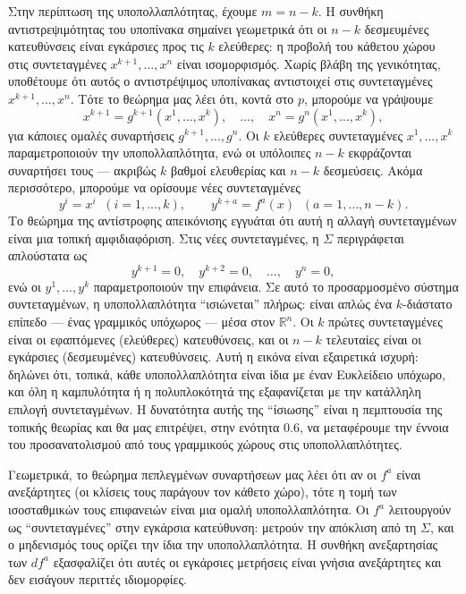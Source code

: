 \documentclass[12pt]{article}
\begin{document}
Στην περίπτωση της υποπολλαπλότητας, έχουμε $m = n-k$. Η συνθήκη αντιστρεψιμότητας του υποπίνακα σημαίνει γεωμετρικά ότι οι $n-k$ δεσμευμένες κατευθύνσεις είναι εγκάρσιες προς τις $k$ ελεύθερες: η προβολή του κάθετου χώρου στις συντεταγμένες $x^{k+1}, \dots, x^n$ είναι ισομορφισμός. Χωρίς βλάβη της γενικότητας, υποθέτουμε ότι αυτός ο αντιστρέψιμος υποπίνακας αντιστοιχεί στις συντεταγμένες $x^{k+1}, \dots, x^n$. Τότε το θεώρημα μας λέει ότι, κοντά στο $p$, μπορούμε να γράψουμε
\[
x^{k+1} = g^{k+1}(x^1, \dots, x^k), \quad \dots, \quad x^n = g^n(x^1, \dots, x^k),
\]
για κάποιες ομαλές συναρτήσεις $g^{k+1}, \dots, g^n$. Οι $k$ ελεύθερες συντεταγμένες $x^1, \dots, x^k$ παραμετροποιούν την υποπολλαπλότητα, ενώ οι υπόλοιπες $n-k$ εκφράζονται συναρτήσει τους --- ακριβώς $k$ βαθμοί ελευθερίας και $n-k$ δεσμεύσεις. Ακόμα περισσότερο, μπορούμε να ορίσουμε νέες συντεταγμένες
\[
y^i = x^i \;\; (i = 1, \dots, k), \qquad y^{k+a} = f^a(x) \;\; (a = 1, \dots, n-k).
\]
Το θεώρημα της αντίστροφης απεικόνισης εγγυάται ότι αυτή η αλλαγή συντεταγμένων είναι μια τοπική αμφιδιαφόριση. Στις νέες συντεταγμένες, η $\Sigma$ περιγράφεται απλούστατα ως
\[
y^{k+1} = 0, \quad y^{k+2} = 0, \quad \dots, \quad y^n = 0,
\]
ενώ οι $y^1, \dots, y^k$ παραμετροποιούν την επιφάνεια. Σε αυτό το προσαρμοσμένο σύστημα συντεταγμένων, η υποπολλαπλότητα ``ισιώνεται'' πλήρως: είναι απλώς ένα $k$-διάστατο επίπεδο --- ένας γραμμικός υπόχωρος --- μέσα στον $\mathbb{R}^n$. Οι $k$ πρώτες συντεταγμένες είναι οι εφαπτόμενες (ελεύθερες) κατευθύνσεις, και οι $n-k$ τελευταίες είναι οι εγκάρσιες (δεσμευμένες) κατευθύνσεις. Αυτή η εικόνα είναι εξαιρετικά ισχυρή: δηλώνει ότι, τοπικά, κάθε υποπολλαπλότητα είναι ίδια με έναν Ευκλείδειο υπόχωρο, και όλη η καμπυλότητα ή η πολυπλοκότητά της εξαφανίζεται με την κατάλληλη επιλογή συντεταγμένων. Η δυνατότητα αυτής της ``ίσιωσης'' είναι η πεμπτουσία της τοπικής θεωρίας και θα μας επιτρέψει, στην ενότητα 0.6, να μεταφέρουμε την έννοια του προσανατολισμού από τους γραμμικούς χώρους στις υποπολλαπλότητες.

Γεωμετρικά, το θεώρημα πεπλεγμένων συναρτήσεων μας λέει ότι αν οι $f^a$ είναι ανεξάρτητες (οι κλίσεις τους παράγουν τον κάθετο χώρο), τότε η τομή των ισοσταθμικών τους επιφανειών είναι μια ομαλή υποπολλαπλότητα. Οι $f^a$ λειτουργούν ως ``συντεταγμένες'' στην εγκάρσια κατεύθυνση: μετρούν την απόκλιση από τη $\Sigma$, και ο μηδενισμός τους ορίζει την ίδια την υποπολλαπλότητα. Η συνθήκη ανεξαρτησίας των $df^a$ εξασφαλίζει ότι αυτές οι εγκάρσιες μετρήσεις είναι γνήσια ανεξάρτητες και δεν εισάγουν περιττές ιδιομορφίες.
\end{document}
